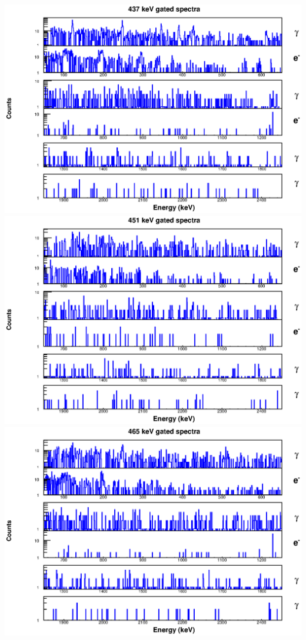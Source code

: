 \includegraphics[scale=0.8]{154Gd_Appendix/437_combined.eps}
\includegraphics[scale=0.8]{154Gd_Appendix/451_combined.eps}
\includegraphics[scale=0.8]{154Gd_Appendix/465_combined.eps}
